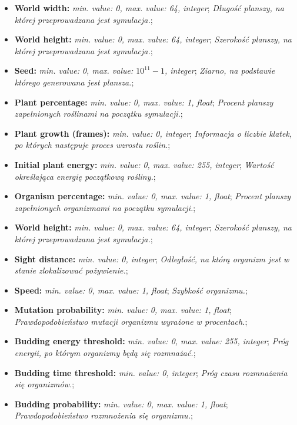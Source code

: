 \documentclass[a4paper]{article}
\begin{document}
\begin{itemize}
\itemsep1pt\parskip0pt
\item
  \textbf{World width:} \emph{min. value: 0, max. value: 64, integer};
  \emph{Długość planszy, na której przeprowadzana jest symulacja.};
\item
  \textbf{World height:} \emph{min. value: 0, max. value: 64, integer};
  \emph{Szerokość planszy, na której przeprowadzana jest symulacja.};
\item
  \textbf{Seed:} \emph{min. value: 0, max. value: $10^{11}-1$, integer};
  \emph{Ziarno, na podstawie którego generowana jest plansza.};
\item
  \textbf{Plant percentage:} \emph{min. value: 0, max. value: 1, float};
  \emph{Procent planszy zapełnionych roślinami na początku symulacji.};
\item
  \textbf{Plant growth (frames):} \emph{min. value: 0, integer};
  \emph{Informacja o liczbie klatek, po których następuje proces wzrostu
  roślin.};
\item
  \textbf{Initial plant energy:} \emph{min. value: 0, max. value: 255,
  integer}; \emph{Wartość określająca energię początkową rośliny.};
\item
  \textbf{Organism percentage:} \emph{min. value: 0, max. value: 1,
  float}; \emph{Procent planszy zapełnionych organizmami na początku
  symulacji.};
\item
  \textbf{World height:} \emph{min. value: 0, max. value: 64, integer};
  \emph{Szerokość planszy, na której przeprowadzana jest symulacja.};
\item
  \textbf{Sight distance:} \emph{min. value: 0, integer};
  \emph{Odległość, na którą organizm jest w stanie zlokalizować
  pożywienie.};
\item
  \textbf{Speed:} \emph{min. value: 0, max. value: 1, float};
  \emph{Szybkość organizmu.};
\item
  \textbf{Mutation probability:} \emph{min. value: 0, max. value: 1,
  float}; \emph{Prawdopodobieństwo mutacji organizmu wyrażone w
  procentach.};
\item
  \textbf{Budding energy threshold:} \emph{min. value: 0, max. value:
  255, integer}; \emph{Próg energii, po którym organizmy będą się
  rozmnażać.};
\item
  \textbf{Budding time threshold:} \emph{min. value: 0, integer};
  \emph{Próg czasu rozmnażania się organizmów.};
\item
  \textbf{Budding probability:} \emph{min. value: 0, max. value: 1,
  float}; \emph{Prawdopodobieństwo rozmnożenia się organizmu.};

\end{itemize}
\end{document}
